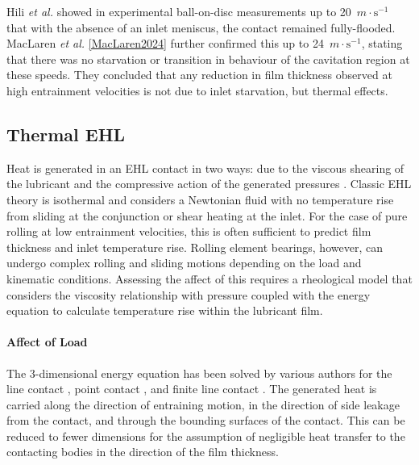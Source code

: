 Hili \textit{et al.} \cite{Hili2010} showed in experimental ball-on-disc measurements up to 20~$m\cdot\mathrm{s}^{-1}$ that with the absence of an inlet meniscus, the contact remained fully-flooded. MacLaren \textit{et al.} \ref{MacLaren2024} further confirmed this up to 24~$m\cdot\mathrm{s}^{-1}$, stating that there was no starvation or transition in behaviour of the cavitation region at these speeds. They concluded that any reduction in film thickness observed at high entrainment velocities is not due to inlet starvation, but thermal effects.

\subsection{Thermal EHL}\label{Thermal EHL}

Heat is generated in an EHL contact in two ways: due to the viscous shearing of the lubricant and the compressive action of the generated pressures \cite{Mohammadpour2015c}. Classic EHL theory is isothermal and considers a Newtonian fluid with no temperature rise from sliding at the conjunction or shear heating at the inlet. For the case of pure rolling at low entrainment velocities, this is often sufficient to predict film thickness and inlet temperature rise. Rolling element bearings, however, can undergo complex rolling and sliding motions depending on the load and kinematic conditions. Assessing the affect of this requires a rheological model that considers the viscosity relationship with pressure coupled with the energy equation to calculate temperature rise within the lubricant film.

\paragraph{Affect of Load}

The 3-dimensional energy equation has been solved by various authors for the line contact \cite{Yang2001}, point contact \cite{Kim1993},\cite{Kim1993a} and finite line contact \cite{Liu2002}. The generated heat is carried along the direction of entraining motion, in the direction of side leakage from the contact, and through the bounding surfaces of the contact. This can be reduced to fewer dimensions for the assumption of negligible heat transfer to the contacting bodies in the direction of the film thickness.

